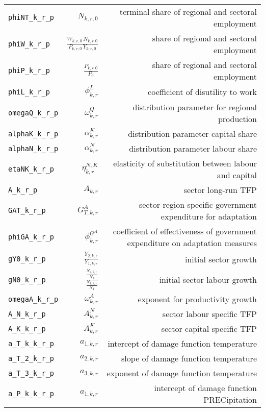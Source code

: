 \begin{center}
\begin{longtable}{lrr}
\texttt{phiNT\_k\_r\_p} & ${N_{k,r,0}}$ & terminal share of regional and sectoral employment\\
\texttt{phiW\_k\_r\_p} & $\frac{W_{k,r,0} \, N_{k,r,0}}{P_{k,r,0} \, Y_{k,r,0}}$ & share of regional and sectoral employment\\
\texttt{phiP\_k\_r\_p} & $\frac{P_{k,r,0}}{P_{0}}$ & share of regional and sectoral employment\\
\texttt{phiL\_k\_r\_p} & ${\phi^{L}_{k,r}}$ & coefficient of disutility to work\\
\texttt{omegaQ\_k\_r\_p} & ${\omega^{Q}_{k,r}}$ & distribution parameter for regional production\\
\texttt{alphaK\_k\_r\_p} & ${\alpha^{K}_{k,r}}$ & distribution parameter capital share\\
\texttt{alphaN\_k\_r\_p} & ${\alpha^{N}_{k,r}}$ & distribution parameter labour share\\
\texttt{etaNK\_k\_r\_p} & ${\eta^{N,K}_{k,r}}$ & elasticity of substitution between labour and capital\\
\texttt{A\_k\_r\_p} & ${A_{k,r}}$ & sector long-run TFP\\
\texttt{GAT\_k\_r\_p} & ${G^{A}_{T,k,r}}$ & sector region specific government expenditure for adaptation\\
\texttt{phiGA\_k\_r\_p} & ${\phi^{G^{A}}_{k,r}}$ & coefficient of effectiveness of government expenditure on adaptation measures\\
\texttt{gY0\_k\_r\_p} & ${\frac{Y_{2,k,r}}{Y_{1,k,r}}}$ & initial sector growth\\
\texttt{gN0\_k\_r\_p} & $\frac{\frac{N_{2,k,r}}{N_{2}}}{\frac{N_{1,k,r}}{N_{1}}}$ & initial sector labour growth\\
\texttt{omegaA\_k\_r\_p} & ${\omega^{A}_{k,r}}$ & exponent for productivity growth\\
\texttt{A\_N\_k\_r\_p} & ${A^{N}_{k,r}}$ & sector labour specific TFP\\
\texttt{A\_K\_k\_r\_p} & ${A^{K}_{k,r}}$ & sector capital specific TFP\\
\texttt{a\_T\_k\_k\_r\_p} & ${a_{1,k,r}}$ & intercept of damage function temperature\\
\texttt{a\_T\_2\_k\_r\_p} & ${a_{2,k,r}}$ & slope of damage function temperature\\
\texttt{a\_T\_3\_k\_r\_p} & ${a_{3,k,r}}$ & exponent of damage function temperature\\
\texttt{a\_P\_k\_k\_r\_p} & ${a_{1,k,r}}$ & intercept of damage function PRECipitation\\

\end{longtable}
\end{center}
